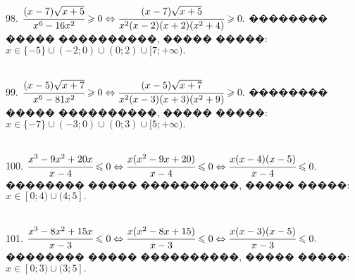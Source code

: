 \documentclass[12pt]{article}
\begin{document}
98. $\cfrac{(x-7)\sqrt{x+5}}{x^6-16x^2}\geqslant0\Leftrightarrow
\cfrac{(x-7)\sqrt{x+5}}{x^2(x-2)(x+2)(x^2+4)}\geqslant0.$ �������� ����� ����������, ����� �����: $x\in\{-5\}\cup(-2;0)\cup(0;2)\cup[7;+\infty).$
\begin{figure}[ht!]
\end{figure}\\
99. $\cfrac{(x-5)\sqrt{x+7}}{x^6-81x^2}\geqslant0\Leftrightarrow
\cfrac{(x-5)\sqrt{x+7}}{x^2(x-3)(x+3)(x^2+9)}\geqslant0.$ �������� ����� ����������, ����� �����: $x\in\{-7\}\cup(-3;0)\cup(0;3)\cup[5;+\infty).$
\begin{figure}[ht!]
\end{figure}\\
100. $\cfrac{x^3-9x^2+20x}{x-4}\leqslant0\Leftrightarrow \cfrac{x(x^2-9x+20)}{x-4}\leqslant0\Leftrightarrow\cfrac{x(x-4)(x-5)}{x-4}\leqslant0.$ �������� ����� ����������, ����� �����: $x\in[0;4)\cup(4;5].$
\begin{figure}[ht!]
\end{figure}\\
101. $\cfrac{x^3-8x^2+15x}{x-3}\leqslant0\Leftrightarrow \cfrac{x(x^2-8x+15)}{x-3}\leqslant0\Leftrightarrow\cfrac{x(x-3)(x-5)}{x-3}\leqslant0.$ �������� ����� ����������, ����� �����: $x\in[0;3)\cup(3;5].$
\begin{figure}[ht!]
\end{figure}
\newpage
\end{document}
